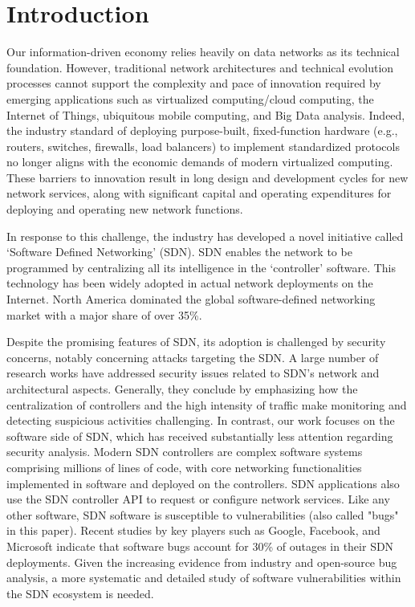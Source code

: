 \section{Introduction}
Our information-driven economy relies heavily on data networks as its technical foundation. However, traditional network architectures and technical evolution processes cannot support the complexity and pace of innovation required by emerging applications such as virtualized computing/cloud computing, the Internet of Things, ubiquitous mobile computing, and Big Data analysis\citep{mad1}. Indeed, the industry standard of deploying purpose-built, fixed-function hardware (e.g., routers, switches, firewalls, load balancers) to implement standardized protocols no longer aligns with the economic demands of modern virtualized computing\citep{mad1}. These barriers to innovation result in long design and development cycles for new network services, along with significant capital and operating expenditures for deploying and operating new network functions.

In response to this challenge, the industry has developed a novel initiative called ‘Software Defined Networking’ (SDN). SDN enables the network to be programmed by centralizing all its intelligence in the ‘controller’ software. This technology has been widely adopted in actual network deployments on the Internet. North America dominated the global software-defined networking market with a major share of over 35\%\citep{mad4}.

Despite the promising features of SDN, its adoption is challenged by security concerns, notably concerning attacks targeting the SDN\citep{mad3}. A large number of research works have addressed security issues related to SDN's network\citep{10157809} and architectural\citep{7593247}\citep{10226193} aspects. Generally, they conclude by emphasizing how the centralization of controllers and the high intensity of traffic make monitoring and detecting suspicious activities challenging.
In contrast, our work focuses on the software side of SDN, which has received substantially less attention regarding security analysis. Modern SDN controllers are complex software systems comprising millions of lines of code, with core networking functionalities implemented in software and deployed on the controllers. SDN applications also use the SDN controller API to request or configure network services. Like any other software, SDN software is susceptible to vulnerabilities (also called "bugs" in this paper). Recent studies by key players such as Google\citep{10.1145/2934872.2934891}, Facebook\citep{10.1145/3230543.3230546}, and Microsoft\citep{10.1145/3132747.3132759} indicate that software bugs account for 30\% of outages in their SDN deployments. Given the increasing evidence from industry and open-source bug analysis, a more systematic and detailed study of software vulnerabilities within the SDN ecosystem is needed.

